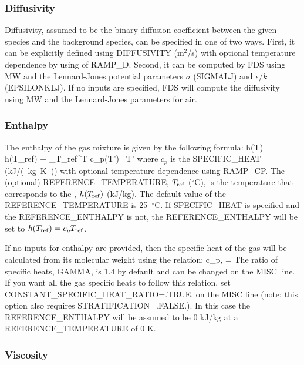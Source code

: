 \documentclass[11pt]{book}
\begin{document}
\subsubsection{Diffusivity}

Diffusivity, assumed to be the binary diffusion coefficient between the given species and the background species, can be specified in one of two ways.  First, it can be explicitly defined using {\ct DIFFUSIVITY} (m$^2$/s) with optional temperature dependence by using of {\ct RAMP\_D}.  Second, it can be computed by FDS using {\ct MW} and the Lennard-Jones potential parameters $\sigma$ ({\ct SIGMALJ}) and $\epsilon/k$ ({\ct EPSILONKLJ}).  If no inputs are specified, FDS will compute the diffusivity using {\ct MW} and the Lennard-Jones parameters for air.

\subsubsection{Enthalpy}
\label{info:Enthalpy}

The enthalpy of the gas mixture is given by the following formula:
\be
   h(T) = h(T_{\rm ref}) + \int_{T_{\rm ref}}^T c_p(T') \, \d T'
\ee
where $c_p$ is the {\ct SPECIFIC\_HEAT} (\si{kJ/(kg.K)}) with optional temperature dependence using {\ct RAMP\_CP}.  The (optional) {\ct REFERENCE\_TEMPERATURE}, $T_{\rm ref}$ ($^\circ$C), is the temperature that corresponds to the , $h(T_{\rm ref})$ (kJ/kg).  The default value of the  {\ct REFERENCE\_TEMPERATURE} is 25~$^\circ$C.  If {\ct SPECIFIC\_HEAT} is specified and the {\ct REFERENCE\_ENTHALPY} is not, the {\ct REFERENCE\_ENTHALPY} will be set to $h(T_{\rm ref})=c_p T_{\rm ref}$.

If no inputs for enthalpy are provided, then the specific heat of the gas will be calculated from its molecular weight using the relation:
\be
   c_{p,\alpha} =  
\ee
The ratio of specific heats, {\ct GAMMA}, is 1.4 by default and can be changed on the {\ct MISC} line. If you want all the gas specific heats to follow this relation, set {\ct CONSTANT\_SPECIFIC\_HEAT\_RATIO=.TRUE.} on the {\ct MISC} line (note: this option also requires {\ct STRATIFICATION=.FALSE.}).  In this case the {\ct REFERENCE\_ENTHALPY} will be assumed to be 0 kJ/kg at a {\ct REFERENCE\_TEMPERATURE} of 0 K.

\subsubsection{Viscosity}
\end{document}
